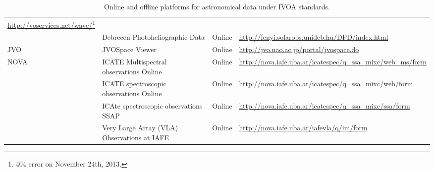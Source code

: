 \begin{table}
\begin{tabular}{|m{2cm}|m{4.5cm}|m{1.5cm}|m{6cm}|}
    \url{http://voservices.net/wave/}\footnote{404 error on November 24th,
                                               2013.} \\
    \cline{2-4}
     & Debrecen Photoheliographic Data & Online &
     \url{http://fenyi.solarobs.unideb.hu/DPD/index.html} \\
     \hline
    JVO & JVOSpace Viewer & Online &
    \url{http://jvo.nao.ac.jp/portal/jvospace.do} \\
    \hline
    \multirow{4}{*}{NOVA} & ICATE Multispectral observations Online & Online 
    & \url{http://nova.iafe.uba.ar/icatespec/q_ssa_mixc/web_ms/form} \\
    \cline{2-4}
     & ICATE spectroscopic observations Online & Online
     & \url{http://nova.iafe.uba.ar/icatespec/q_ssa_mixc/web/form} \\
     \cline{2-4}
     & ICAte spectroscopic observations SSAP & Online
     & \url{http://nova.iafe.uba.ar/icatespec/q_ssa_mixc/ssa/form} \\
     \cline{2-4}
     & Very Large Array (VLA) Observations at IAFE & Online 
     & \url{http://nova.iafe.uba.ar/iafevla/q/im/form} \\
     \hline
\end{tabular}
\caption{Online and offline platforms for astronomical data under IVOA
         standards.}
\label{table:vo_platforms}
\end{table}
